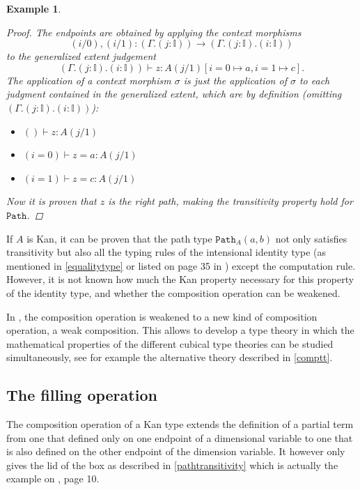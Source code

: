 \documentclass[12pt,a4paper,twoside,xetex]{book}
\newtheorem{example}[theorem]{Example}
\newcommand{\op}[1]{\mathtt{#1}}
\begin{document}
\begin{example}
\begin{proof}
The endpoints are obtained by applying the context morphisms $$(i/0),(i/1): 
(\Gamma . ( j : \mathbb{I})) \rightarrow (\Gamma. ( j : \mathbb{I}) . ( i :  
\mathbb{I}))$$ to the generalized extent judgement $$(\Gamma. ( j : \mathbb{I}) 
. ( i :  \mathbb{I})) \vdash z : A(j/1) [i =0 \mapsto a, i=1 \mapsto c].$$ The 
application of a context morphism $\sigma$  is just the application of $\sigma$ 
to each judgment contained in the generalized extent, which are by definition 
(omitting $(\Gamma. ( j : \mathbb{I}) . ( i :  \mathbb{I}))$):

\begin{itemize}
\item $ () \vdash z: A(j/1)$
\item $ (i = 0) \vdash z = a : A(j/1)$
\item $ (i = 1) \vdash z = c : A(j/1)$
\end{itemize}

Now it is proven that $z$ is the right path, making the transitivity 
property hold for $\op{Path}$. 

\end{proof} 

\end{example}

If $A$ is Kan, it can be proven that the path type $\op{Path}_A(a,b)$ not only  
satisfies transitivity but also all the typing rules of  the intensional 
identity type (as mentioned in \cref{equalitytype} or listed on page 35 in 
\cite{Orton2019}) except the computation rule. However, it is not known how 
much the Kan property necessary for this property of the identity type, and 
whether the composition operation can be weakened. 

In \cite{Cavallo2019}, the composition operation is weakened to a new kind of 
composition operation, a weak composition. This allows to develop a type theory 
in which the mathematical properties of the different cubical type theories can 
be studied simultaneously, see for example the alternative theory described in 
\cref{comptt}.


\subsection{The filling operation}\label{filling}

The composition operation of a Kan type extends the definition of a partial 
term from one that defined only on one  endpoint  of a dimensional variable to 
one that is also defined on the other endpoint of the dimension variable. It 
however only gives the lid of the box as described in 
\cref{pathtransitivity} which is actually the example  on \cite{Coquand2018}, 
page 10. 
\end{document}
